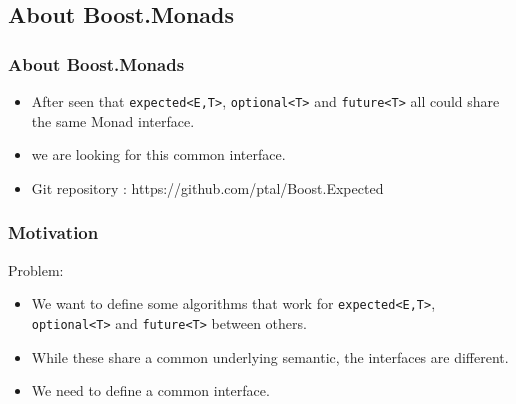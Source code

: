 \documentclass[xcolor=dvipsnames]{beamer}
\newcommand{\cpp}[1]{\lstinline{#1}}
\begin{document}
\subsection{About Boost.Monads}
\begin{frame}
\frametitle{About Boost.Monads}

\begin{itemize}
\item After seen that \cpp{expected<E,T>}, \cpp{optional<T>} and \cpp{future<T>} all could share the same Monad interface.
\item we are looking for this common interface.
\end{itemize}

\begin{itemize}
\item Git repository : https://github.com/ptal/Boost.Expected
\end{itemize}
\end{frame}

\begin{frame}[fragile]
\frametitle{Motivation}

Problem:

\begin{itemize}
  \item We want to define some algorithms that work for \cpp{expected<E,T>}, \cpp{optional<T>} and \cpp{future<T>} between others.
  \item While these share a common underlying semantic, the interfaces are different.
  \item We need to define a common interface. 
\end{itemize}

\end{frame}
\end{document}

